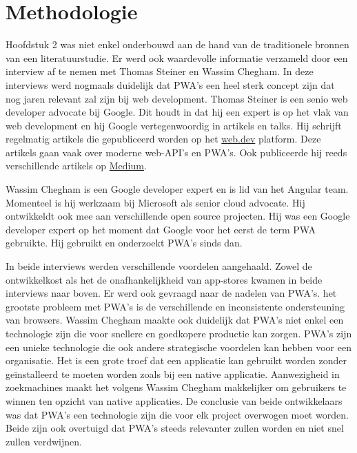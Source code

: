
\chapter{Methodologie}
\label{ch:methodologie}

Hoofdstuk 2 was niet enkel onderbouwd aan de hand van de traditionele bronnen van een literatuurstudie. 
Er werd ook waardevolle informatie verzameld door een interview af te nemen met Thomas Steiner en Wassim Chegham. In deze interviews werd nogmaals duidelijk dat PWA's een heel sterk concept zijn dat nog jaren relevant zal zijn bij web development.
Thomas Steiner is een senio web developer advocate bij Google. Dit houdt in dat hij een expert is op het vlak van web development en hij Google vertegenwoordig in artikels en talks. Hij schrijft regelmatig artikels die gepubliceerd worden op het \href{https://web.dev/authors/thomassteiner/}{web.dev} platform. Deze artikels gaan vaak over moderne web-API's en PWA's. Ook publiceerde hij reeds verschillende artikels op \href{https://medium.com/@tomayac}{Medium}.

Wassim Chegham is een Google developer expert en is lid van het Angular team. Momenteel is hij werkzaam bij Microsoft als senior cloud advocate. Hij ontwikkeldt ook mee aan verschillende open source projecten. Hij was een Google developer expert op het moment dat Google voor het eerst de term PWA gebruikte. Hij gebruikt en onderzoekt PWA's sinds dan.

In beide interviews werden verschillende voordelen aangehaald.  Zowel de ontwikkelkost als het de onafhankelijkheid van app-stores kwamen in beide interviews naar boven. Er werd ook gevraagd naar de nadelen van PWA's. het grootste probleem met PWA's is de verschillende en  inconsistente ondersteuning van browsers.
Wassim Chegham maakte ook duidelijk dat PWA's niet enkel een technologie zijn die voor snellere en goedkopere productie kan zorgen. PWA's zijn een unieke technologie die ook andere strategische voordelen kan hebben voor een organisatie. Het is een grote troef dat een applicatie kan gebruikt worden zonder geïnstalleerd te moeten worden zoals bij een native applicatie. 
Aanwezigheid in zoekmachines maakt het volgens Wassim Chegham makkelijker om gebruikers te winnen ten opzicht van native applicaties.
De conclusie van beide ontwikkelaars was dat PWA's een technologie zijn die voor elk project overwogen moet worden. Beide zijn ook overtuigd dat PWA's steeds relevanter zullen worden en niet snel zullen verdwijnen.

